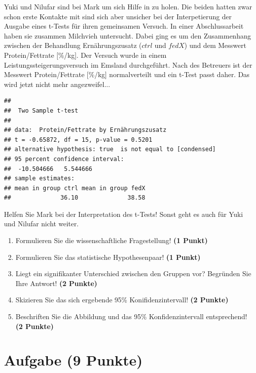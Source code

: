\documentclass[a4paper, 9pt]{scrartcl}\usepackage[]{graphicx}\usepackage[]{xcolor}
\makeatletter
\newenvironment{kframe}{%
 \def\at@end@of@kframe{}%
 \ifinner\ifhmode%
  \def\at@end@of@kframe{\end{minipage}}%
  \begin{minipage}{\columnwidth}%
 \fi\fi%
 \def\FrameCommand##1{\hskip\@totalleftmargin \hskip-\fboxsep
 \colorbox{shadecolor}{##1}\hskip-\fboxsep
     \hskip-\linewidth \hskip-\@totalleftmargin \hskip\columnwidth}%
 \MakeFramed {\advance\hsize-\width
   \@totalleftmargin\z@ \linewidth\hsize
   \@setminipage}}%
 {\par\unskip\endMakeFramed%
 \at@end@of@kframe}
\newenvironment{knitrout}{}{} %
\makeatother
\begin{document}
Yuki und Nilufar sind bei Mark um sich Hilfe in \Rlogo zu holen. Die beiden hatten zwar schon erste Kontakte mit \Rlogo sind sich aber unsicher bei der Interpetierung der Ausgabe eines t-Tests für ihren gemeinsamen Versuch. In einer Abschlussarbeit haben sie zusammen Milchvieh untersucht. Dabei ging es um den Zusammenhang zwischen der Behandlung Ernährungszusatz ($ctrl$ und $fedX$) und dem Messwert Protein/Fettrate [\%/kg]. Der Versuch wurde in einem Leistungssteigerungsversuch im Emsland durchgeführt. Nach des Betreuers ist der Messwert Protein/Fettrate [\%/kg] normalverteilt und ein t-Test passt daher. Das wird jetzt nicht mehr angezweifel...

\begin{knitrout}
\color{fgcolor}\begin{kframe}
\begin{verbatim}
## 
## 	Two Sample t-test
## 
## data:  Protein/Fettrate by Ernährungszusatz
## t = -0.65872, df = 15, p-value = 0.5201
## alternative hypothesis: true  is not equal to [condensed]
## 95 percent confidence interval:
##  -10.504666   5.544666
## sample estimates:
## mean in group ctrl mean in group fedX 
##              36.10              38.58
\end{verbatim}
\end{kframe}
\end{knitrout}

Helfen Sie Mark bei der Interpretation des t-Tests! Sonst geht es auch für Yuki und Nilufar nicht weiter.

\begin{enumerate}
  \item Formulieren Sie die wissenschaftliche Fragestellung! \textbf{(1 Punkt)}
  \item Formulieren Sie das statistische Hypothesenpaar! \textbf{(1 Punkt)}
\item Liegt ein signifikanter Unterschied zwischen den Gruppen vor? Begründen Sie Ihre Antwort! \textbf{(2 Punkte)}
\item Skizieren Sie das sich ergebende 95\% Konifidenzintervall! \textbf{(2 Punkte)}
\item Beschriften Sie die Abbildung und das 95\% Konfidenzintervall entsprechend! \textbf{(2 Punkte)}  
\end{enumerate} 
\clearpage

\section{Aufgabe \hfill (9 Punkte)}
\end{document}
